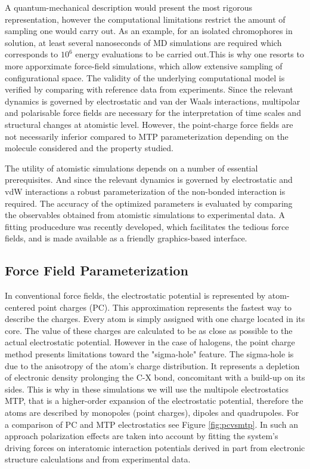 \documentclass[journal=jacsat,manuscript=article]{achemso}
\begin{document}
\noindent
A quantum-mechanical description would present the most rigorous
representation, however the computational limitations restrict the
amount of sampling one would carry out. As an example, for an isolated
chromophores in solution, at least several nanoseconds of MD
simulations are required which corresponds to $10^6$ energy
evaluations to be carried out.This is why one resorts to more
apporximate force-field simulations, which allow extensive sampling of
configurational space. The validity of the underlying computational
model is verified by comparing with reference data from
experiments. Since the relevant dynamics is governed by electrostatic
and van der Waals interactions, multipolar and polarisable force
fields are necessary for the interpretation of time scales and
structural changes at atomistic level. However, the point-charge force
fields are not necessarily inferior compared to MTP parameterization
depending on the molecule considered and the property studied.

\noindent
The utility of atomistic simulations depends on a number of essential
prerequisites. And since the relevant dynamics is governed by
electrostatic and vdW interactions a robust parameterization of the
non-bonded interaction is required. The accuracy of the optimized
parameters is evaluated by comparing the observables obtained from
atomistic simulations to experimental data. A fitting producedure was
recently developed, which facilitates the tedious force fields, and is
made available as a friendly graphics-based interface.


\subsection{Force Field Parameterization}
In conventional force fields, the electrostatic potential is
represented by atom-centered point charges (PC). This approximation
represents the fastest way to describe the charges. Every atom is
simply assigned with one charge located in its core. The value of
these charges are calculated to be as close as possible to the actual
electrostatic potential. However in the case of halogens, the point
charge method presents limitations toward the "sigma-hole"
feature. The sigma-hole is due to the anisotropy of the atom's charge
distribution. It represents a depletion of electronic density
prolonging the C-X bond, concomitant with a build-up on its
sides. This is why in these simulations we will use the multipole
electrostatics MTP, that is a higher-order expansion of the
electrostatic potential, therefore the atoms are described by
monopoles (point charges), dipoles and quadrupoles. For a comparison
of PC and MTP electrostatics see Figure \ref{fig:pcvsmtp}. In such an
approach polarization effects are taken into account by fitting the
system's driving forces on interatomic interaction potentials derived
in part from electronic structure calculations and from experimental
data.
\end{document}
